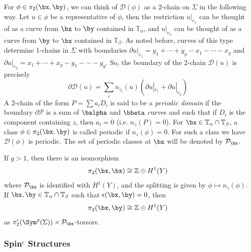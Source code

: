 For $\phi \in \pi_2(\bx,\by)$, we can think of $\mathcal D(\phi)$ as a 2-chain on $\Sigma$ in the following way. Let $u \in \phi$ be a representative of $\phi$, then the restriction $u|_{e_1}$ can be thought of as a curve from $\bx$ to $\by$ contained in $\mathbb T_\alpha$, and $u|_{e_2}$ can be thought of as a curve from $\by$ to $\bx$ contained in $\mathbb T_\beta$. As noted before, curves of this type determine 1-chains in $\Sigma$ with boundaries $\partial u|_{e_1} = y_1+\cdots+y_g-x_1-\cdots-x_g$ and $\partial u|_{e_2} = x_1+\cdots+x_g-y_1-\cdots-y_g$. So, the boundary of the 2-chain $\mathcal D(u)$ is precisely 
\[ \partial \mathcal D(u) = \sum_i n_{z_i}(u) (\partial u|_{e_1} + \partial u|_{e_2}) \]
A 2-chain of the form $P = \sum a_i D_i$ is said to be a \emph{periodic domain} if the boundary $\partial \mathcal P$ is a sum of $\balpha$ and $\bbeta$ curves and such that if $D_i$ is the component containing $z$, then $a_i=0$ (i.e. $n_z(P)=0$). For $\bx \in \mathbb T_\alpha \cap \mathbb T_\beta$, a class $\phi \in \pi_2(\bx,\by)$ is called periodic if $n_z(\phi)=0$. For such a class we have $\mathcal D(\phi)$ is periodic. The set of periodic classes at $\bx$ will be denoted by $\mathcal P_\bx$.
\begin{prop}
If $g>1$, then there is an isomorphism 
\[ \pi_2(\bx,\bx) \cong \mathbb Z \oplus H^1(Y) \]
where $\mathcal P_\bx$ is identified with $H^1(Y)$, and the splitting is given by $\phi \mapsto n_z(\phi)$. If $\bx,\by \in \mathbb T_\alpha \cap \mathbb T_\beta$ such that $\epsilon(\bx,\by)=0$, then
\[ \pi_2(\bx,\by) \cong \mathbb Z \oplus H^1(Y) \]
as $\pi_2'(\Sym^g(\Sigma)) \times \mathcal P_\bx$-torsors. 
\end{prop}





\subsubsection*{Spin$^c$ Structures}


